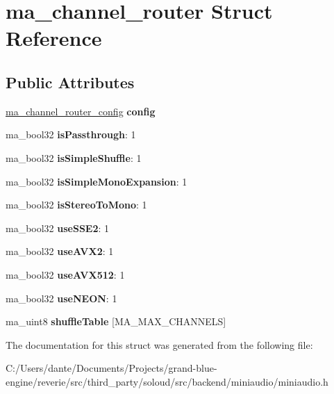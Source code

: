 \hypertarget{structma__channel__router}{}\section{ma\+\_\+channel\+\_\+router Struct Reference}
\label{structma__channel__router}
\subsection*{Public Attributes}
\begin{DoxyCompactItemize}
\item 
\mbox{\label{structma__channel__router_a9f22cd2db9c72e5d4e1fc47a66742d8e}} 
\mbox{\hyperlink{structma__channel__router__config}{ma\+\_\+channel\+\_\+router\+\_\+config}} {\bfseries config}
\item 
\mbox{\label{structma__channel__router_a6884828e6068e27316db383f91d97289}} 
ma\+\_\+bool32 {\bfseries is\+Passthrough}\+: 1
\item 
\mbox{\label{structma__channel__router_a413ffe2768b9aaaaa4dc590a427f5053}} 
ma\+\_\+bool32 {\bfseries is\+Simple\+Shuffle}\+: 1
\item 
\mbox{\label{structma__channel__router_aec2f0b635f6744282dd9ab80371c8635}} 
ma\+\_\+bool32 {\bfseries is\+Simple\+Mono\+Expansion}\+: 1
\item 
\mbox{\label{structma__channel__router_aa2d4334fd3e2176315f19b6226a51674}} 
ma\+\_\+bool32 {\bfseries is\+Stereo\+To\+Mono}\+: 1
\item 
\mbox{\label{structma__channel__router_a2ec238d51de7b910e5eb1043c6a43283}} 
ma\+\_\+bool32 {\bfseries use\+S\+S\+E2}\+: 1
\item 
\mbox{\label{structma__channel__router_a317234ef4b4cb95f2740d74867e988eb}} 
ma\+\_\+bool32 {\bfseries use\+A\+V\+X2}\+: 1
\item 
\mbox{\label{structma__channel__router_aab4eb474fd8c0f1bff4a9c1801b25310}} 
ma\+\_\+bool32 {\bfseries use\+A\+V\+X512}\+: 1
\item 
\mbox{\label{structma__channel__router_acace01672bf82513f95ab52b82dbdc55}} 
ma\+\_\+bool32 {\bfseries use\+N\+E\+ON}\+: 1
\item 
\mbox{\label{structma__channel__router_a8d79592705dd28a0f93b12b78401c54b}} 
ma\+\_\+uint8 {\bfseries shuffle\+Table} \mbox{[}M\+A\+\_\+\+M\+A\+X\+\_\+\+C\+H\+A\+N\+N\+E\+LS\mbox{]}
\end{DoxyCompactItemize}


The documentation for this struct was generated from the following file\+:\begin{DoxyCompactItemize}
\item 
C\+:/\+Users/dante/\+Documents/\+Projects/grand-\/blue-\/engine/reverie/src/third\+\_\+party/soloud/src/backend/miniaudio/miniaudio.\+h\end{DoxyCompactItemize}
